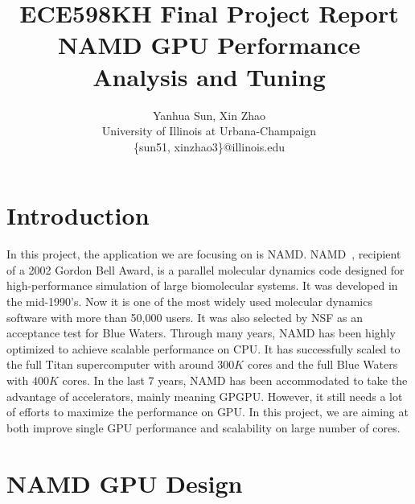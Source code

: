 \documentclass[11pt,onecolumn]{article}
\newcommand{\namd}{\textsc{namd}}
\begin{document}

\title{ ECE598KH Final Project Report \\ NAMD GPU Performance Analysis and Tuning}

\author{
  Yanhua Sun, Xin Zhao\\
  University of Illinois at Urbana-Champaign\\
  \{sun51, xinzhao3\}@illinois.edu
}

\date{}
\maketitle

\lstset{
  basicstyle=\ttfamily,
  showstringspaces=false
}

%
%

\section{Introduction}
In this project, the application we are focusing on is NAMD.
NAMD~\cite{NamdSC02}, recipient of a 2002 Gordon Bell Award, is a parallel molecular 
dynamics code designed for high-performance simulation of large biomolecular systems.
It was developed in the mid-1990's. Now it is one of the most widely used molecular dynamics 
software with more than 50,000 users. It was also selected by NSF as an acceptance test
for Blue Waters.
Through many years, NAMD has been highly optimized to achieve scalable performance on CPU.
It has successfully scaled to the full Titan supercomputer with around $300K$ cores and 
the full Blue Waters with $400K$ cores. In the last 7 years, NAMD has been accommodated
to take the advantage of accelerators, mainly meaning GPGPU. However, it still needs a lot of 
efforts to maximize the performance on GPU. In this project, we are aiming at both 
improve single GPU performance  and scalability on large number of cores. 

\section{NAMD GPU Design } 

\end{document}
